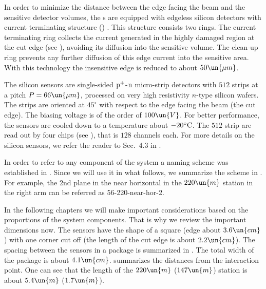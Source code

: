 In order to minimize the distance between the  edge facing the beam and the sensitive detector volumes, the s are equipped with edgeless silicon detectors with current terminating structure () . This structure consists two rings. The current terminating ring collects the current generated in the highly damaged region at the cut edge (see ), avoiding its diffusion into the sensitive volume. The clean-up ring prevents any further diffusion of this edge current into the sensitive area. With this technology the insensitive edge is reduced to about $50\un{\mu m}$.

\eject
The silicon sensors are single-sided $\rm p^+$-$\rm n$ micro-strip detectors with $512$ strips at a pitch $P = 66\un{\mu m}$, processed on very high resistivity
$n$-type silicon wafers. The strips are oriented at $45^\circ$ with respect to the edge facing the beam (the cut edge). The biasing voltage is of the order of $100\un{V}$. For better performance, the sensors are cooled down to a temperature about $-20^\circ\rm C$. The $512$ strip are read out by four  chips (see ), that is $128$ channels each. For more details on the silicon sensors, we refer the reader to Sec.~4.3 in .

In order to refer to any component of the  system a naming scheme was established in . Since we will use it in what follows, we summarize the scheme in . For example, the 2nd plane in the near horizontal  in the $220\un{m}$ station in the right arm can be referred as 56-220-near-hor-2.


In the following chapters we will make important considerations based on the proportions of the  system components. That is why we review the important dimensions now. The sensors have the shape of a square (edge about $3.6\un{cm}$) with one corner cut off (the length of the cut edge is about $2.2\un{cm}$). The spacing between the sensors in a package is summarized in . The total width of the package is about $4.1\un{cm}$.  summarizes the  distances from the interaction point. One can see that the length of the $220\un{m}$ ($147\un{m}$) station is about $5.4\un{m}$ ($1.7\un{m}$).


